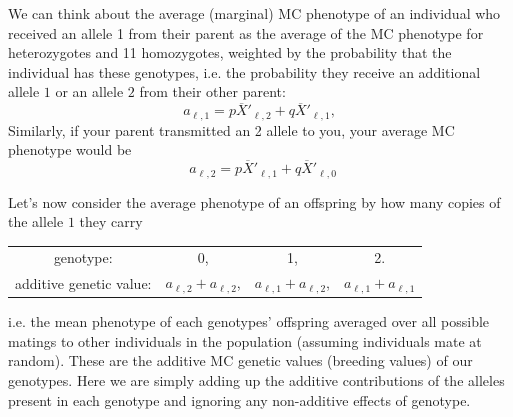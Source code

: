 We can think about the average
(marginal) MC
phenotype of an individual who received an allele 1 from their parent as the average of the MC phenotype for heterozygotes and 11 homozygotes, weighted by the probability that
the individual has these genotypes, i.e. the probability they receive an additional allele $1$ or an allele $2$ from their other parent:
\begin{equation} 
  a_{\ell, 1} = p\overline{X}'_{\ell,2}  + q\overline{X}'_{\ell,1}, \label{eqn:add_effect1}
\end{equation}
Similarly, if your parent transmitted an 2 allele to you, your average
MC phenotype would be
\begin{equation}
  ~~ a_{\ell, 2} = p\overline{X}'_{\ell,1}  + q\overline{X}'_{\ell,0} \label{eqn:add_effect2}
\end{equation}



Let's now consider the average phenotype of an offspring by how many
copies of the allele $1$ they carry
\begin{center}
\begin{tabular}{cccc}
genotype: & 0, & 1, & 2.\\
additive genetic value: & $a_{\ell,2}+ a_{\ell,2}$, & $a_{\ell,1}+a_{\ell,2}$, & $a_{\ell,1}+a_{\ell,1}$   \label{add_values}
\end{tabular}
\end{center}
%
i.e. the mean phenotype of each genotypes' offspring
averaged over all possible matings to other individuals in the
population (assuming individuals mate at random). These are the
additive MC genetic values (breeding values) of our genotypes. 
Here we are simply adding up the additive contributions of the alleles present
in each genotype and ignoring any non-additive effects of genotype.

